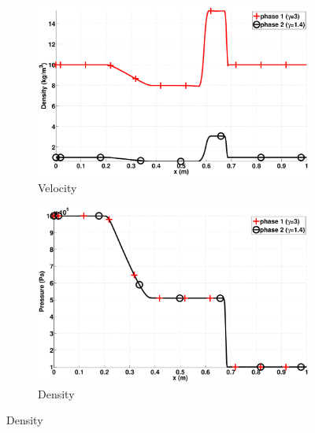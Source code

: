 \documentclass[preprint,10pt]{elsarticle}
\begin{document}
\begin{figure}[H]
        \centering
        \begin{subfigure}[b]{0.495\textwidth}
                \centering
                \includegraphics[width=\textwidth]{figures/relaxation_two_phases_density.eps}
                \caption{Velocity}
                \label{fig:inf-rel-vel}
        \end{subfigure}%
        \begin{subfigure}[b]{0.495\textwidth}
                \centering
                \includegraphics[width=\textwidth]{figures/relaxation_two_phases_pressure.eps}
                \caption{Density}
                \label{fig:inf-rel-density}
        \end{subfigure}
        

\end{figure}
\end{document}
